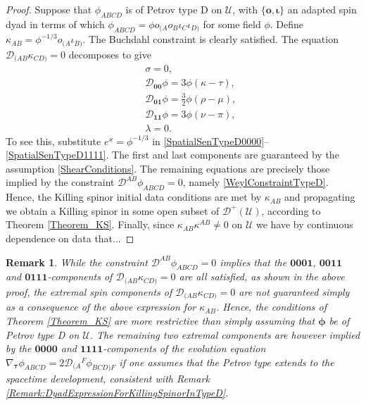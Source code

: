 \documentclass[10pt,a4paper]{article}
\theoremstyle{plain}
\newtheorem{remark}{Remark}
\def\bmo{{\bm o}}
\begin{document}
\begin{proof}
Suppose that $\phi_{ABCD}$ is of Petrov type D on $\mathcal{U}$, with $\lbrace \bmo, \bm\iota\rbrace$ an adapted spin dyad in terms of which $\phi_{ABCD}=\phi o_{(A}o_B\iota_C\iota_{D)}$ for some field $\phi$. Define $\kappa_{AB}=\phi^{-1/3}o_{(A}\iota_{B)}$. The Buchdahl constraint is clearly satisfied. The equation $\mathcal{D}_{(AB}\kappa_{CD)}=0$ decomposes to give 
\begin{eqnarray*}
&& \sigma=0,\\
&& \mathcal{D}_{\bm0\bm0}\phi = 3\phi(\kappa - \tau), \\
&& \mathcal{D}_{\bm0\bm1}\phi = \tfrac{3}{2} \phi(\rho - \mu),\\
&& \mathcal{D}_{\bm1\bm1}\phi = 3\phi(\nu - \pi), \\
&& \lambda = 0.
\end{eqnarray*}
To see this, substitute $e^{\varkappa}=\phi^{-1/3}$ in \eqref{SpatialSenTypeD0000}--\eqref{SpatialSenTypeD1111}.
The first and last components are guaranteed by the assumption \eqref{ShearConditions}.
The remaining equations are precisely those implied by the constraint $\mathcal{D}^{AB}\phi_{ABCD}=0$, namely  \eqref{WeylConstraintTypeD}.
Hence, the Killing spinor initial data conditions are met by $\kappa_{AB}$ and propagating we obtain a Killing spinor in some open subset of $\mathcal{D}^+(\mathcal{U})$, according to Theorem \ref{Theorem_KS}. Finally, since $\kappa_{AB}\kappa^{AB}\neq 0$ on $\mathcal{U}$ we have by continuous dependence on data that...
\end{proof}

\begin{remark}{\em 
 While the constraint $\mathcal{D}^{AB}\phi_{ABCD}=0$ implies that the $\bm0\bm0\bm0\bm1$, $\bm0\bm0\bm1\bm1$ and $\bm0\bm1\bm1\bm1$-components of $\mathcal{D}_{(AB}\kappa_{CD)}=0$
  are all satisfied, as shown in the above proof, the extremal spin components of $\mathcal{D}_{(AB}\kappa_{CD)}=0$ are not guaranteed simply as a consequence of the above expression for $\kappa_{AB}$. Hence, the conditions of Theorem \ref{Theorem_KS} are more restrictive than simply assuming that $\bm\phi$ be of Petrov type D on $\mathcal{U}$. The remaining two extremal components are however implied by the $\bm0\bm0\bm0\bm0$ and $\bm1\bm1\bm1\bm1$-components of the \emph{evolution equation} $\nabla_{\bm\tau}\phi_{ABCD}=2\mathcal{D}_{(A}{}^F\phi_{BCD)F}$ \emph{if} one assumes that the Petrov type extends to the spacetime development, consistent with Remark \ref{Remark:DyadExpressionForKillingSpinorInTypeD}.
  }
\end{remark}
\end{document}
